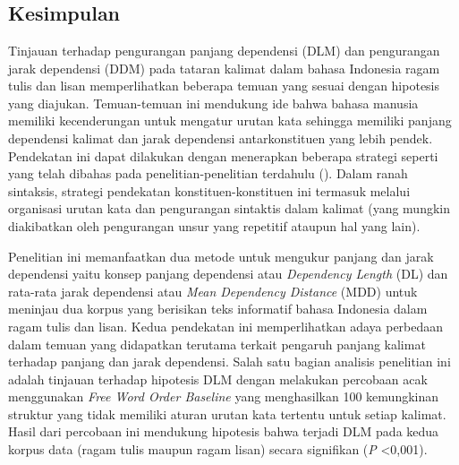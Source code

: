 \chapter{\kesimpulan}


\section{Kesimpulan}

Tinjauan terhadap pengurangan panjang dependensi (DLM) dan pengurangan jarak dependensi (DDM) pada tataran kalimat dalam bahasa Indonesia ragam tulis dan lisan memperlihatkan beberapa temuan yang sesuai dengan hipotesis yang diajukan. Temuan-temuan ini mendukung ide bahwa bahasa manusia memiliki kecenderungan untuk mengatur urutan kata sehingga memiliki panjang dependensi kalimat dan jarak dependensi antarkonstituen yang lebih pendek. Pendekatan ini dapat dilakukan dengan menerapkan beberapa strategi seperti yang telah dibahas pada penelitian-penelitian terdahulu (\citealp{jaeger2006redundancy, gildea2015human}). Dalam ranah sintaksis, strategi pendekatan konstituen-konstituen ini termasuk melalui organisasi urutan kata dan pengurangan sintaktis dalam kalimat (yang mungkin diakibatkan oleh pengurangan unsur yang repetitif ataupun hal yang lain). 

Penelitian ini memanfaatkan dua metode untuk mengukur panjang dan jarak dependensi yaitu konsep panjang dependensi atau \textit{Dependency Length} (DL) dan rata-rata jarak dependensi atau \textit{Mean Dependency Distance} (MDD) untuk meninjau dua korpus yang berisikan teks informatif bahasa Indonesia dalam ragam tulis dan lisan. Kedua pendekatan ini memperlihatkan adaya perbedaan dalam temuan yang didapatkan terutama terkait pengaruh panjang kalimat terhadap panjang dan jarak dependensi. Salah satu bagian analisis penelitian ini adalah tinjauan terhadap hipotesis DLM dengan melakukan percobaan acak menggunakan \textit{Free Word Order Baseline} \citep{futrell2015large} yang menghasilkan 100 kemungkinan struktur yang tidak memiliki aturan urutan kata tertentu untuk setiap kalimat. Hasil dari percobaan ini mendukung hipotesis bahwa terjadi DLM pada kedua korpus data (ragam tulis maupun ragam lisan) secara signifikan (\textit{P} \textless 0,001). 

